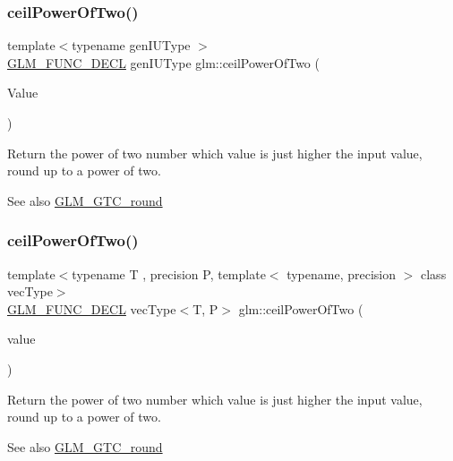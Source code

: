 \subsubsection{\texorpdfstring{ceilPowerOfTwo()}{ceilPowerOfTwo()}\hspace{0.1cm}{\footnotesize\ttfamily [1/2]}}
{\footnotesize\ttfamily template$<$typename gen\+I\+U\+Type $>$ \\
\mbox{\hyperlink{setup_8hpp_ab2d052de21a70539923e9bcbf6e83a51}{G\+L\+M\+\_\+\+F\+U\+N\+C\+\_\+\+D\+E\+CL}} gen\+I\+U\+Type glm\+::ceil\+Power\+Of\+Two (\begin{DoxyParamCaption}\item[{gen\+I\+U\+Type}]{Value }\end{DoxyParamCaption})}

Return the power of two number which value is just higher the input value, round up to a power of two.

\begin{DoxySeeAlso}{See also}
\mbox{\hyperlink{group__gtc__round}{G\+L\+M\+\_\+\+G\+T\+C\+\_\+round}} 
\end{DoxySeeAlso}
\mbox{\label{group__gtc__round_ga76ec9b214ea1376fe09a903e34bab847}} 
\subsubsection{\texorpdfstring{ceilPowerOfTwo()}{ceilPowerOfTwo()}\hspace{0.1cm}{\footnotesize\ttfamily [2/2]}}
{\footnotesize\ttfamily template$<$typename T , precision P, template$<$ typename, precision $>$ class vec\+Type$>$ \\
\mbox{\hyperlink{setup_8hpp_ab2d052de21a70539923e9bcbf6e83a51}{G\+L\+M\+\_\+\+F\+U\+N\+C\+\_\+\+D\+E\+CL}} vec\+Type$<$T, P$>$ glm\+::ceil\+Power\+Of\+Two (\begin{DoxyParamCaption}\item[{vec\+Type$<$ T, P $>$ const \&}]{value }\end{DoxyParamCaption})}

Return the power of two number which value is just higher the input value, round up to a power of two.

\begin{DoxySeeAlso}{See also}
\mbox{\hyperlink{group__gtc__round}{G\+L\+M\+\_\+\+G\+T\+C\+\_\+round}} 
\end{DoxySeeAlso}


